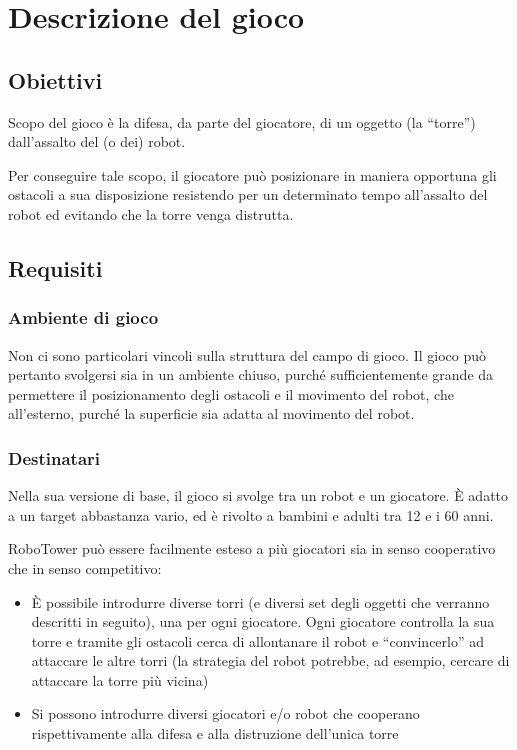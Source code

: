 \chapter{Descrizione del gioco}
\label{cap:descrizione}

\section{Obiettivi}
Scopo del gioco è la difesa, da parte del giocatore, di un oggetto (la ``torre'') dall'assalto del (o dei) robot.

Per conseguire tale scopo, il giocatore può posizionare in maniera opportuna gli ostacoli a sua disposizione resistendo per un determinato tempo all'assalto del robot ed evitando che la torre venga distrutta.

\section{Requisiti}

\subsection*{Ambiente di gioco}
Non ci sono particolari vincoli sulla struttura del campo di gioco. Il gioco può pertanto svolgersi sia in un ambiente chiuso, purché sufficientemente grande da permettere il posizionamento degli ostacoli e il movimento del robot, che all'esterno, purché la superficie sia adatta al movimento del robot.

\subsection*{Destinatari}
Nella sua versione di base, il gioco si svolge tra un robot e un giocatore. È adatto a un target abbastanza vario, ed è rivolto a bambini e adulti tra 12 e i 60 anni.

RoboTower può essere facilmente esteso a più giocatori sia in senso cooperativo che in senso competitivo:
	\begin{itemize}
		\item È possibile introdurre diverse torri (e diversi set degli oggetti che verranno descritti in seguito), una per ogni giocatore. Ogni giocatore controlla la sua torre e tramite gli ostacoli cerca di allontanare il robot e ``convincerlo'' ad attaccare le altre torri (la strategia del robot potrebbe, ad esempio, cercare di attaccare la torre più vicina)
		\item Si possono introdurre diversi giocatori e/o robot che cooperano rispettivamente alla difesa e alla distruzione dell'unica torre
	\end{itemize}

